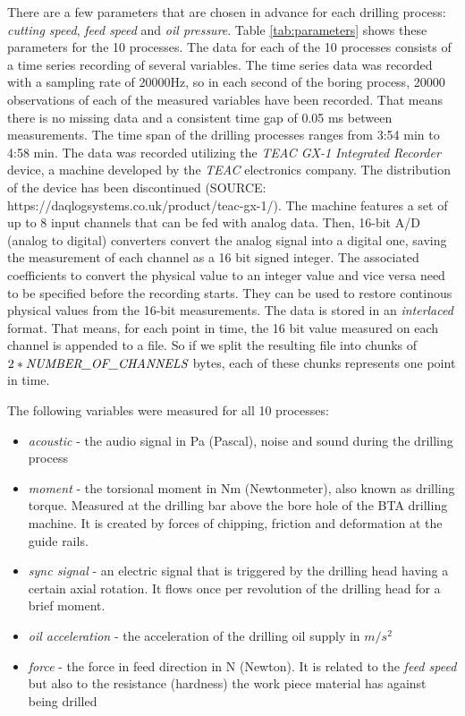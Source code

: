 \documentclass[12 pt]{scrartcl}
\begin{document}
There are a few parameters that are chosen in advance for each drilling process: \emph{cutting speed}, \emph{feed speed} and \emph{oil pressure}. Table \ref{tab:parameters} shows these parameters for the 10 processes.
The data for each of the 10 processes consists of a time series recording of several variables.
The time series data was recorded with a sampling rate of 20000Hz, so in each second of the boring process, 20000 observations of each of the measured variables have been recorded. That means there is no missing data and a consistent time gap of 0.05 ms between measurements. The time span of the drilling processes ranges from 3:54 min to 4:58 min.
The data was recorded utilizing the \emph{TEAC GX-1 Integrated Recorder} device, a machine developed by the \emph{TEAC} electronics company. The distribution of the device has been discontinued (SOURCE: https://daqlogsystems.co.uk/product/teac-gx-1/). The machine features a set of up to 8 input channels that can be fed with analog data.
Then, 16-bit A/D (analog to digital) converters convert the analog signal into a digital one, saving the measurement of each channel as a 16 bit signed integer.
The associated coefficients to convert the physical value to an integer value and vice versa need to be specified before the recording starts. They can be used to restore continous physical values from the 16-bit measurements. The data is stored in an \emph{interlaced} format. That means, for each point in time, the 16 bit value measured on each channel is appended to a file. So if we split the resulting file into chunks of $2*\emph{NUMBER\_OF\_CHANNELS}$ bytes, each of these chunks represents one point in time.

The following variables were measured for all 10 processes:
\begin{itemize}
  \item \emph{acoustic} - the audio signal in Pa (Pascal), noise and sound during the drilling process
  \item \emph{moment} - the torsional moment in Nm (Newtonmeter), also known as drilling torque. Measured at the drilling bar above the bore hole of the BTA drilling machine. It is created by forces of chipping, friction and deformation at the guide rails.
  \item \emph{sync signal} - an electric signal that is triggered by the drilling head having a certain axial rotation. It flows once per revolution of the drilling head for a brief moment.
  \item \emph{oil acceleration} - the acceleration of the drilling oil supply in $m/s^2$
  \item \emph{force} - the force in feed direction in N (Newton). It is related to the \emph{feed speed} but also to the resistance (hardness) the work piece material has against being drilled
\end{itemize}
\end{document}
